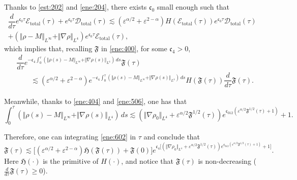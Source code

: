 \documentclass[11pt]{article}
\theoremstyle{plain}
\theoremstyle{definition}
\theoremstyle{remark}
\newcommand{\mrm}[1]{\mathrm{#1}}
\newcommand{\norm}[2]{\Vert #1 \Vert_{#2}}
\numberwithin{equation}{section}
\begin{document}
Thanks to \eqref{est:202} and \eqref{ene:204}, there exists $ \mathfrak c_0 $ small enough such that 
\begin{equation}
    \label{ene:601}
\begin{gathered}
    \dfrac{d}{d\tau} e^{\mathfrak c_0 \tau} \mathcal E_\mrm{total}(\tau) + e^{\mathfrak c_0 \tau} \mathcal D_\mrm{total}(\tau) \lesssim (\varepsilon^{\alpha/2} + \varepsilon^{2-\alpha}) H(\mathcal E_\mrm{total}(\tau)) e^{\mathfrak c_0 \tau} \mathcal D_\mrm{total}(\tau) \\
        + (\norm{\rho-M}{L^\infty} + \norm{\nabla \rho}{L^4}) e^{\mathfrak c_0 \tau} \mathcal E_\mrm{total}(\tau), 
\end{gathered}
\end{equation}
which implies that, recalling $ \mathfrak F $ in \eqref{ene:400}, for some $ \mathfrak c_4 > 0 $, 
\begin{equation}
    \label{ene:602}
\begin{aligned}
    & \dfrac{d}{d\tau} e^{- \mathfrak c_4 \int_0^\tau (\norm{\rho(s)-M}{L^\infty} + \norm{\nabla \rho(s)}{L^4})\,ds} \mathfrak F(\tau) \\
    &\qquad \lesssim (\varepsilon^{\alpha/2} + \varepsilon^{2-\alpha}) e^{- \mathfrak c_4 \int_0^\tau (\norm{\rho(s)-M}{L^\infty} + \norm{\nabla \rho(s)}{L^4})\,ds} H(\mathfrak F(\tau)) \dfrac{d}{d\tau} \mathfrak F(\tau).
\end{aligned}
\end{equation}

Meanwhile, thanks to \eqref{ene:404} and \eqref{ene:506}, one has that
\begin{equation}
    \label{ene:603}
    \int_0^\tau (\norm{\rho(s)-M}{L^\infty} + \norm{\nabla \rho(s)}{L^4}) \,ds \lesssim (\norm{\nabla\rho_0}{L^4} + \varepsilon^{\alpha/2} \mathfrak F^{1/2}(\tau)) e^{\mathfrak c_{012}(\varepsilon^{\alpha/2}\mathfrak F^{1/2}(\tau) + 1)} + 1.
\end{equation}

Therefore, one can integrating \eqref{ene:602} in $ \tau $ and conclude that 
\begin{equation}
    \label{ene:604}
    \mathfrak F(\tau) \lesssim \bigl\lbrack (\varepsilon^{\alpha/2} + \varepsilon^{2-\alpha}) \mathfrak H(\mathfrak F(\tau)) +  \mathfrak F (0) \bigr\rbrack e^{\mathfrak c_4 \lbrack (\norm{\nabla\rho_0}{L^4} + \varepsilon^{\alpha/2} \mathfrak F^{1/2}(\tau)) e^{\mathfrak c_{012}(\varepsilon^{\alpha/2}\mathfrak F^{1/2}(\tau) + 1)} + 1 \rbrack }. 
\end{equation}
Here $ \mathfrak H(\cdot) $ is the primitive of $ H(\cdot) $, and notice that $ \mathfrak F(\tau) $ is non-decreasing ($ \frac{d}{d\tau} \mathfrak F(\tau) \geq 0 $).
\end{document}
